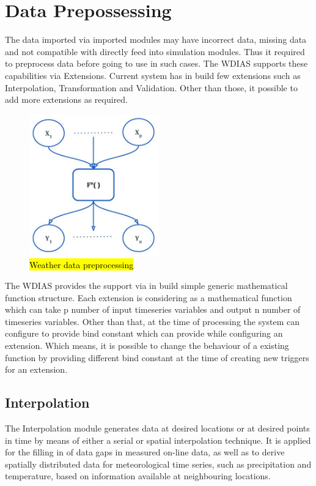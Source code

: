 \section{Data Prepossessing}
\label{se:data_preprocess}

The data imported via imported modules may have incorrect data, missing data and not compatible with directly feed into simulation modules. 
Thus it required to preprocess data before going to use in such cases. The WDIAS supports these capabilities via Extensions. Current system has
in build few extensions such as Interpolation, Transformation and Validation. Other than those, it possible to add more extensions as required.
\begin{figure}[htp]
    \centering
    \includegraphics[width=0.5\textwidth]{method/data_preprocess/weather_data_preprocessing.jpg}
    \caption{\hl{Weather data preprocessing}}
    \label{fi:weather_data_preprocessing}
\end{figure}

The WDIAS provides the support via in build simple generic mathematical function structure. Each extension is considering as a mathematical function which can take p 
number of input timeseries variables and output n number of timeseries variables. Other than that, at the time of processing the system can configure to provide
bind constant which can provide while configuring an extension. Which means, it is possible to change the behaviour of a existing function by providing different bind
constant at the time of creating new triggers for an extension.

\subsection{Interpolation}
The Interpolation module generates data at desired locations or at desired points in time by means of either a serial or spatial interpolation technique. It is applied for the filling in of data gaps in measured on-line data, as well as to derive spatially distributed data for meteorological time series, such as precipitation and temperature, based on information available at neighbouring locations.

